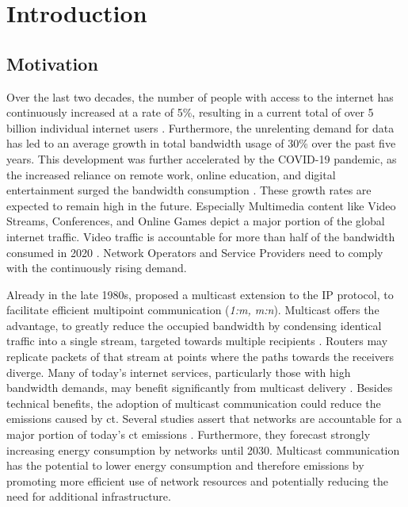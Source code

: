\chapter{Introduction} %
\label{chap:Introduction}


\section{Motivation} %
\label{sec:Motivation}


Over the last two decades, the number of people with access to the internet has
    continuously increased at a rate of 5\%, resulting in a current total of
    over 5 billion individual internet users \cite{itu_digdev}.
Furthermore, the unrelenting demand for data has led to an average growth in
    total bandwidth usage of 30\% over the past five years.
This development was further accelerated by the COVID-19 pandemic, as the
    increased reliance on remote work, online education, and digital
    entertainment surged the bandwidth consumption \cite{cartesian_us_bw}.
These growth rates are expected to remain high in the future.
Especially Multimedia content like Video Streams, Conferences, and Online Games
    depict a major portion of the global internet traffic.
Video traffic is accountable for more than half of the bandwidth consumed in
    2020 \cite{cartesian_us_bw}.
Network Operators and Service Providers need to comply with the continuously
    rising demand.

Already in the late 1980s, \citeauthor{deering1990multicast} proposed a
    multicast extension to the IP protocol, to facilitate efficient multipoint
    communication (\textit{1:m, m:n})\cite{deering1990multicast, rfc1112_ipmc}.
Multicast offers the advantage, to greatly reduce the occupied bandwidth by
    condensing identical traffic into a single stream, targeted towards
    multiple recipients \cite{rfc3376_igmp}.
Routers may replicate packets of that stream at points where the paths towards 
    the receivers diverge.
Many of today's internet services, particularly those with high bandwidth
    demands, may benefit significantly from multicast delivery
    \cite{ratnasamy2006revisiting, meadcast1}.
Besides technical benefits, the adoption of multicast communication could
    reduce the emissions caused by \gls{ct}.
Several studies assert that networks are accountable for a major portion of
    today's \gls{ct} emissions \cite{andrae2015global}.
Furthermore, they forecast strongly increasing energy consumption by networks
    until 2030.
Multicast communication has the potential to lower energy consumption and
    therefore emissions by promoting more efficient use of network resources
    and potentially reducing the need for additional infrastructure.


